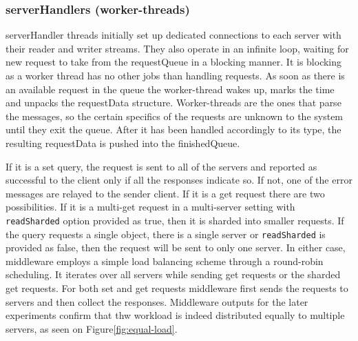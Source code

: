 \documentclass[11pt,a4paper]{article}
\begin{document}
\subsubsection{serverHandlers (worker-threads)} \label{sec:ov-workerthread}
serverHandler threads initially set up dedicated connections to each server with their reader and writer streams. They also operate in an infinite loop, waiting for new request to take from the requestQueue in a blocking manner. It is blocking as a worker thread has no other jobs than handling requests. As soon as there is an available request in the queue the worker-thread wakes up, marks the time and unpacks the requestData structure. Worker-threads are the ones that parse the messages, so the certain specifics of the requests are unknown to the system until they exit the queue. After it has been handled accordingly to its type, the resulting requestData is pushed into the finishedQueue.
\par
If it is a set query, the request is sent to all of the servers and reported as successful to the client only if all the responses indicate so. If not, one of the error messages are relayed to the sender client. If it is a get request there are two possibilities. If it is a multi-get request in a multi-server setting with \texttt{readSharded} option provided as true, then it is sharded into smaller requests. If the query requests a single object, there is a single server or \texttt{readSharded} is provided as false, then the request will be sent to only one server. In either case, middleware employs a simple load balancing scheme through a round-robin scheduling. It iterates over all servers while sending get requests or the sharded get requests. For both set and get requests middleware first sends the requests to servers and then collect the responses. Middleware outputs for the later experiments confirm that thw workload is indeed distributed equally to multiple servers, as seen on Figure\ref{fig:equal-load}.
\end{document}
